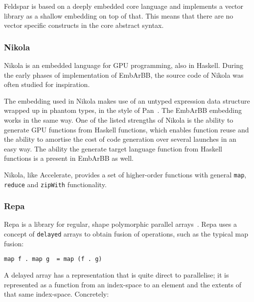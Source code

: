 Feldspar is based on a deeply embedded core language and implements 
a vector library as a shallow embedding on top of that. 
This means that there are no vector specific 
constructs in the core abstract syntax. 




\subsubsection{Nikola} 
Nikola is an embedded language for GPU programming\cite{NIKOLA}, also
in Haskell.  
During the early phases of implementation of EmbArBB, the source code of 
Nikola was often studied for inspiration.

The embedding used in Nikola makes use of an untyped expression 
data structure wrapped up in phantom types, in the style of Pan~\cite{COMPILEEDSL}.
The EmbArBB embedding works in the same way. 
One of the listed strengths of Nikola is the ability to generate GPU functions 
from Haskell functions, which enables function reuse and the ability to 
amortise the cost of code generation over several launches in an easy 
way. The ability the generate target language function from Haskell functions 
is a present in EmbArBB as well. 

Nikola, like Accelerate, provides a set of higher-order functions with
general {\tt map}, {\tt reduce} and {\tt zipWith} functionality.

\subsubsection{Repa} 
Repa is a library for regular, shape polymorphic parallel arrays~\cite{REPA}. Repa 
uses a concept of {\tt delayed} arrays to obtain fusion of operations, such as the 
typical map fusion:
\begin{verbatim}
map f . map g  = map (f . g)
\end{verbatim} 
A delayed array 
has a representation that is quite direct to parallelise; it is represented 
as a function from an index-space to an element and the extents of that same 
index-space. Concretely: 

